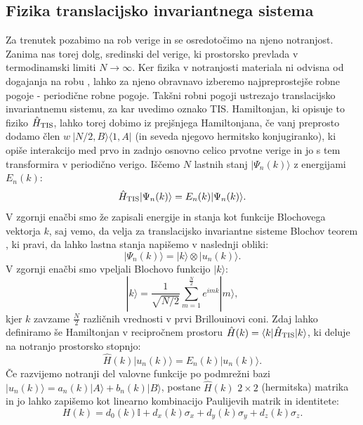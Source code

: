 \subsection{Fizika translacijsko invariantnega sistema}
Za trenutek pozabimo na rob verige in se osredotočimo na njeno notranjost. Zanima nas torej dolg, sredinski del verige, ki prostorsko prevlada v termodinamski limiti $N \to \infty$. Ker fizika v notranjosti materiala ni odvisna od dogajanja na robu \cite{ashcroft}, lahko za njeno obravnavo izberemo najpreprostejše robne pogoje - periodične robne pogoje. Takšni robni pogoji ustrezajo translacijsko invariantnemu sistemu, za kar uvedimo oznako TIS. Hamiltonjan, ki opisuje to fiziko $\hat{H}_{\textup{TIS}}$, lahko torej dobimo iz prejšnjega Hamiltonjana, če vanj preprosto dodamo člen $w\ | N/2, B \rangle \langle 1, A|$  (in seveda njegovo hermitsko konjugiranko), ki opiše interakcijo med prvo in zadnjo osnovno celico prvotne verige in jo s tem transformira v periodično verigo.
Iščemo $N$ lastnih stanj $|\Psi_n (k) \rangle$ z energijami $E_n(k)$:
\begin{equation}
\hat{H}_{\textup{TIS}} | \Psi_n (k) \rangle = E_n(k) | \Psi_n(k) \rangle.
\end{equation} 
V zgornji enačbi smo že zapisali energije in stanja kot funkcije Blochovega vektorja $k$, saj vemo, da velja za translacijsko invariantne sisteme Blochov teorem \cite{ashcroft}, ki pravi, da lahko lastna stanja napišemo v naslednji obliki:
\begin{equation}
| \Psi_n (k) \rangle = | k \rangle \otimes | u_n (k) \rangle.
\end{equation}
V zgornji enačbi smo vpeljali Blochovo funkcijo $|k\rangle$:
\begin{equation}
|k \rangle = \frac{1}{\sqrt{N/2}} \sum_{m=1}^{\frac{N}{2}} e^{imk} |m \rangle,
\end{equation}
kjer $k$ zavzame $\frac{N}{2}$ različnih vrednosti v prvi Brillouinovi coni.
Zdaj lahko definiramo še Hamiltonjan v recipročnem prostoru $\hat{H}(k) = \langle k | \hat{H}_{\textup{TIS}} | k \rangle$, ki deluje na notranjo prostorsko stopnjo:
\begin{equation}
\hat{H}(k) | u_n(k) \rangle = E_n(k) | u_n(k) \rangle.
\end{equation}
Če razvijemo notranji del valovne funkcije po podmrežni bazi $|u_n(k) \rangle = a_n(k) |A \rangle + b_n(k) | B \rangle$,
postane $\hat{H}(k)$  $2 \times 2$ (hermitska) matrika in jo lahko zapišemo kot linearno kombinacijo Paulijevih matrik in identitete:
\begin{equation}
H(k) = d_0 (k) \mathbb{I}+ d_x(k) \sigma_x + d_y (k) \sigma_y + d_z(k) \sigma_z.
\end{equation}
